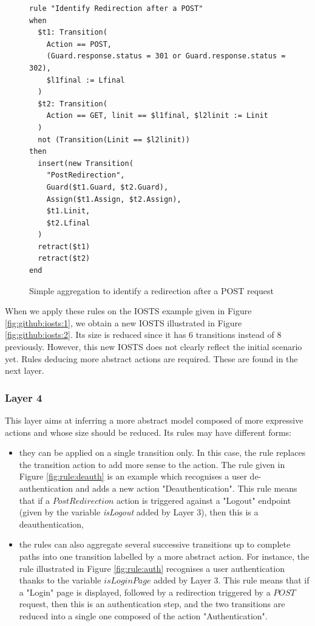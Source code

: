 \begin{figure}[h]
\begin{framed}
\begin{BVerbatim}
rule "Identify Redirection after a POST"
when
  $t1: Transition(
    Action == POST,
    (Guard.response.status = 301 or Guard.response.status = 302),
    $l1final := Lfinal
  )
  $t2: Transition(
    Action == GET, linit == $l1final, $l2linit := Linit
  )
  not (Transition(Linit == $l2linit))
then
  insert(new Transition(
    "PostRedirection",
    Guard($t1.Guard, $t2.Guard),
    Assign($t1.Assign, $t2.Assign),
    $t1.Linit,
    $t2.Lfinal
  )
  retract($t1)
  retract($t2)
end
\end{BVerbatim}
\end{framed}

\caption{Simple aggregation to identify a redirection after a POST request}
\label{fig:rule:redirect}
\end{figure}

\begin{example}
When we apply these rules on the IOSTS example given in Figure
\ref{fig:github:iosts:1}, we obtain a new IOSTS illustrated in
Figure \ref{fig:github:iosts:2}. Its size is reduced since it has
6 transitions instead of 8 previously.  However, this new IOSTS
does not clearly reflect the initial scenario yet. Rules deducing
more abstract actions are required. These are found in the next
layer.
\end{example}

\subsubsection{Layer 4}

This layer aims at inferring a more abstract model composed of
more expressive actions and whose size should be reduced. Its
rules may have different forms:

\begin{itemize}
\item they can be applied on a single transition only. In this
case, the rule replaces the transition action to add more sense
to the action. The rule given in Figure \ref{fig:rule:deauth} is
an example which recognises a user de-authentication and adds a
new action "Deauthentication". This rule means that if a
$PostRedirection$ action is triggered against a "Logout" endpoint
(given by the variable \textit{isLogout} added by Layer 3), then
this is a deauthentication,

\item the rules can also aggregate several successive transitions
up to complete paths into one transition labelled by a more
abstract action. For instance, the rule illustrated in Figure
\ref{fig:rule:auth} recognises a user authentication thanks to
the variable $isLoginPage$ added by Layer 3. This rule means that
if a "Login" page is displayed, followed by a redirection
triggered by a $POST$ request, then this is an authentication
step, and the two transitions are reduced into a single one
composed of the action "Authentication".
\end{itemize}

